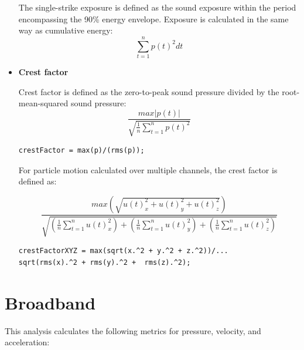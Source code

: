\documentclass[11pt]{report}
\begin{document}
\begin{itemize}
The single-strike exposure is defined as the sound exposure within the period encompassing the 90\% energy envelope.  Exposure is calculated in the same way as cumulative energy:\\

$$ \sum_{t = 1}^{n}p(t)^2 dt $$

\item \textbf{Crest factor}

Crest factor is defined as the zero-to-peak sound pressure divided by the root-mean-squared sound pressure:\\

$$ \frac{\mathit{max}|\mathit{p(t)}|}{\sqrt{\frac{1}{n} \sum_{t = 1}^{n}p(t)^2}} $$

\begin{lstlisting}
crestFactor = max(p)/(rms(p));
\end{lstlisting}

For particle motion calculated over multiple channels, the crest factor is defined as:

$$ \frac{\mathit{max}\left( \sqrt{u(t)_x^2 + u(t)_y^2 + u(t)_z^2} \right)}{\sqrt{\left(\frac{1}{n} \sum_{t = 1}^{n}u(t)^2_x \right) + \left(\frac{1}{n} \sum_{t = 1}^{n}u(t)^2_y \right) + \left(\frac{1}{n} \sum_{t = 1}^{n}u(t)^2_z \right)}} $$

\begin{lstlisting}
crestFactorXYZ = max(sqrt(x.^2 + y.^2 + z.^2))/...
sqrt(rms(x).^2 + rms(y).^2 +  rms(z).^2);
\end{lstlisting}

\end{itemize}
\section{Broadband}

This analysis calculates the following metrics for pressure, velocity, and acceleration:
\end{document}
